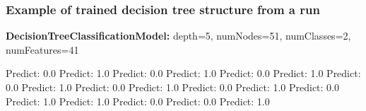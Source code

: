 \documentclass[12pt]{article}
\begin{document}
\subsubsection{Example of trained decision tree structure from a run}

\begin{algorithmic}
\State \textbf{DecisionTreeClassificationModel:} depth=5, numNodes=51, numClasses=2, numFeatures=41

                \State Predict: 0.0
            \Else
                    \State Predict: 1.0
                \Else
                    \State Predict: 0.0
                \EndIf
            \EndIf
        \Else
                \State Predict: 1.0
            \Else
                    \State Predict: 0.0
                \Else
                    \State Predict: 1.0
                \EndIf
            \EndIf
        \EndIf
    \Else
            \State Predict: 0.0
        \Else
                    \State Predict: 1.0
                \Else
                    \State Predict: 0.0
                \EndIf
            \Else
                    \State Predict: 1.0
                \Else
                    \State Predict: 0.0
                \EndIf
            \EndIf
        \EndIf
    \EndIf
\Else
                \State Predict: 1.0
            \Else
                    \State Predict: 0.0
                \Else
                    \State Predict: 1.0
                \EndIf
            \EndIf
        \Else
                    \State Predict: 1.0
                \Else
                    \State Predict: 0.0
                \EndIf
            \Else
                    \State Predict: 0.0
                \Else
                    \State Predict: 1.0
                \EndIf
            \EndIf
        \EndIf
    \Else

\end{algorithmic}
\end{document}

